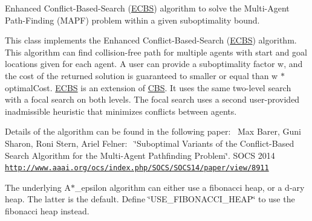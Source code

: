 Enhanced Conflict-\/\+Based-\/\+Search (\hyperlink{classlib_multi_robot_planning_1_1_e_c_b_s}{E\+C\+BS}) algorithm to solve the Multi-\/\+Agent Path-\/\+Finding (M\+A\+PF) problem within a given suboptimality bound. 

This class implements the Enhanced Conflict-\/\+Based-\/\+Search (\hyperlink{classlib_multi_robot_planning_1_1_e_c_b_s}{E\+C\+BS}) algorithm. This algorithm can find collision-\/free path for multiple agents with start and goal locations given for each agent. A user can provide a suboptimality factor w, and the cost of the returned solution is guaranteed to smaller or equal than w $\ast$ optimal\+Cost. \hyperlink{classlib_multi_robot_planning_1_1_e_c_b_s}{E\+C\+BS} is an extension of \hyperlink{classlib_multi_robot_planning_1_1_c_b_s}{C\+BS}. It uses the same two-\/level search with a focal search on both levels. The focal search uses a second user-\/provided inadmissible heuristic that minimizes conflicts between agents.

Details of the algorithm can be found in the following paper\+:~\newline
Max Barer, Guni Sharon, Roni Stern, Ariel Felner\+:~\newline
\char`\"{}\+Suboptimal Variants of the Conflict-\/\+Based Search Algorithm for the Multi-\/\+Agent
\+Pathfinding Problem\char`\"{}. S\+O\+CS 2014~\newline
\href{http://www.aaai.org/ocs/index.php/SOCS/SOCS14/paper/view/8911}{\tt http\+://www.\+aaai.\+org/ocs/index.\+php/\+S\+O\+C\+S/\+S\+O\+C\+S14/paper/view/8911}

The underlying A$\ast$\+\_\+epsilon algorithm can either use a fibonacci heap, or a d-\/ary heap. The latter is the default. Define \char`\"{}\+U\+S\+E\+\_\+\+F\+I\+B\+O\+N\+A\+C\+C\+I\+\_\+\+H\+E\+A\+P\char`\"{} to use the fibonacci heap instead.


